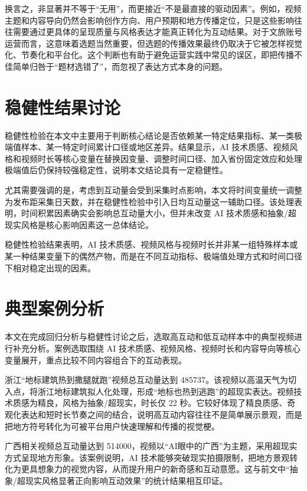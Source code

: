 换言之，非显著并不等于“无用”，而更接近“不是最直接的驱动因素”。例如，视频主题和内容导向仍然会影响创作方向、用户预期和地方传播定位，只是这些影响往往需要通过更具体的呈现质量与风格表达才能真正转化为互动结果。对于文旅账号运营而言，这意味着选题当然重要，但选题的传播效果最终仍取决于它被怎样视觉化、节奏化和平台化。这个判断也有助于避免运营实践中常见的误区，即把传播不佳简单归咎于“题材选错了”，而忽视了表达方式本身的问题。

\section{稳健性结果讨论}

稳健性检验在本文中主要用于判断核心结论是否依赖某一特定结果指标、某一类极端值样本、某一特定时间累计口径或地区差异。结果显示，AI 技术质感、视频风格和视频时长等核心变量在替换因变量、调整时间口径、加入省份固定效应和处理极端值后仍保持较强稳定性，说明本文结论具有一定稳健性。

尤其需要强调的是，考虑到互动量会受到采集时点影响，本文将时间变量统一调整为发布距采集日天数，并在稳健性检验中引入日均互动量这一辅助口径。该处理表明，时间积累因素确实会影响总互动量大小，但并未改变 AI 技术质感和抽象/超现实风格是核心影响因素这一总体结论。

稳健性检验结果表明，AI 技术质感、视频风格与视频时长并非某一组特殊样本或某一种结果变量下的偶然产物，而是在不同互动指标、极端值处理方式和时间口径下相对稳定出现的因素。

\section{典型案例分析}

本文在完成回归分析与稳健性讨论之后，选取高互动和低互动样本中的典型视频进行补充分析。案例选取围绕 AI 技术质感、视频风格、视频时长和内容导向等核心变量展开，重点比较不同内容组合下的互动表现。

浙江“地标建筑热到撒腿就跑”视频总互动量达到 485737。该视频以高温天气为切入点，将浙江地标建筑拟人化处理，形成“地标也热到逃跑”的超现实表达。视频技术质感为精良，风格为抽象/超现实，时长仅 22 秒。它较好体现了精良质感、奇观化表达和短时长节奏之间的结合，说明高互动内容往往不是简单展示景观，而是把地方符号转化为可被平台用户快速理解和传播的视觉梗。

广西相关视频总互动量达到 514000，视频以“AI眼中的广西”为主题，采用超现实方式呈现地方形象。该案例说明，AI 技术能够突破现实拍摄限制，把地方景观转化为更具想象力的视觉内容，从而提升用户的新奇感和互动意愿。这与前文中“抽象/超现实风格显著正向影响互动效果”的统计结果相互印证。


